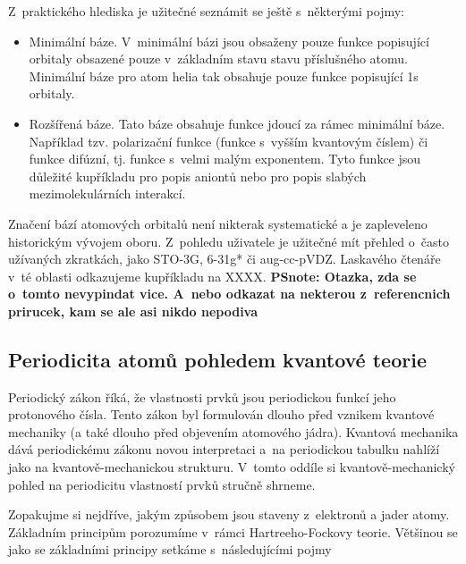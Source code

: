 Z~praktického hlediska je užitečné seznámit se ještě s~některými pojmy:

\begin{itemize}
\item Minimální báze. V~minimální bázi jsou obsaženy pouze funkce popisující orbitaly obsazené pouze v~základním stavu stavu příslušného atomu. Minimální báze pro atom helia tak obsahuje pouze funkce popisující 1s orbitaly.

\item Rozšířená báze. Tato báze obsahuje funkce jdoucí za rámec minimální báze. Například tzv. polarizační funkce (funkce s~vyšším kvantovým číslem) či funkce difúzní, tj. funkce s~velmi malým exponentem. Tyto funkce jsou důležité kupříkladu pro popis aniontů nebo pro popis slabých mezimolekulárních interakcí. 
 
\end{itemize}

Značení bází atomových orbitalů není nikterak systematické a je zapleveleno historickým vývojem oboru. Z~pohledu uživatele je užitečné mít přehled o~často užívaných zkratkách, jako STO-3G, 6-31g* či aug-cc-pVDZ. Laskavého čtenáře v~té oblasti odkazujeme kupříkladu na XXXX. \textbf{PSnote: Otazka, zda se o~tomto nevypindat vice. A~nebo odkazat na nekterou z~referencnich prirucek, kam se ale asi nikdo nepodiva}


\subsection{Periodicita atomů pohledem kvantové teorie}
   
Periodický zákon říká, že vlastnosti prvků jsou periodickou funkcí jeho protonového čísla. Tento zákon byl formulován dlouho před vznikem kvantové mechaniky (a také dlouho před objevením atomového jádra). Kvantová mechanika dává periodickému zákonu novou interpretaci a~na periodickou tabulku nahlíží jako na kvantově-mechanickou strukturu. V~tomto oddíle si kvantově-mechanický pohled na periodicitu vlastností prvků stručně shrneme. 

Zopakujme si nejdříve, jakým způsobem jsou staveny z~elektronů a jader atomy. Základním principům porozumíme v~rámci Hartreeho-Fockovy teorie. Většinou se jako se základními principy setkáme s~následujícími pojmy

